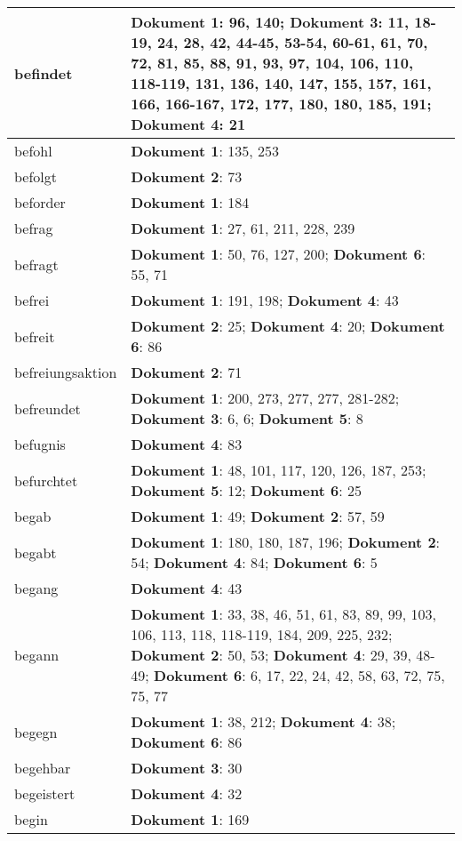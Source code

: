 \documentclass[a5paper]{article}
\begin{document}
\begin{longtable}[l]{|l|p{3in}|}
\hline
befindet & \textbf{Dokument 1}: 96, 140; \textbf{Dokument 3}: 11, 18-19, 24, 28, 42, 44-45, 53-54, 60-61, 61, 70, 72, 81, 85, 88, 91, 93, 97, 104, 106, 110, 118-119, 131, 136, 140, 147, 155, 157, 161, 166, 166-167, 172, 177, 180, 180, 185, 191; \textbf{Dokument 4}: 21 \\
\hline
befohl & \textbf{Dokument 1}: 135, 253 \\
\hline
befolgt & \textbf{Dokument 2}: 73 \\
\hline
beforder & \textbf{Dokument 1}: 184 \\
\hline
befrag & \textbf{Dokument 1}: 27, 61, 211, 228, 239 \\
\hline
befragt & \textbf{Dokument 1}: 50, 76, 127, 200; \textbf{Dokument 6}: 55, 71 \\
\hline
befrei & \textbf{Dokument 1}: 191, 198; \textbf{Dokument 4}: 43 \\
\hline
befreit & \textbf{Dokument 2}: 25; \textbf{Dokument 4}: 20; \textbf{Dokument 6}: 86 \\
\hline
befreiungsaktion & \textbf{Dokument 2}: 71 \\
\hline
befreundet & \textbf{Dokument 1}: 200, 273, 277, 277, 281-282; \textbf{Dokument 3}: 6, 6; \textbf{Dokument 5}: 8 \\
\hline
befugnis & \textbf{Dokument 4}: 83 \\
\hline
befurchtet & \textbf{Dokument 1}: 48, 101, 117, 120, 126, 187, 253; \textbf{Dokument 5}: 12; \textbf{Dokument 6}: 25 \\
\hline
begab & \textbf{Dokument 1}: 49; \textbf{Dokument 2}: 57, 59 \\
\hline
begabt & \textbf{Dokument 1}: 180, 180, 187, 196; \textbf{Dokument 2}: 54; \textbf{Dokument 4}: 84; \textbf{Dokument 6}: 5 \\
\hline
begang & \textbf{Dokument 4}: 43 \\
\hline
begann & \textbf{Dokument 1}: 33, 38, 46, 51, 61, 83, 89, 99, 103, 106, 113, 118, 118-119, 184, 209, 225, 232; \textbf{Dokument 2}: 50, 53; \textbf{Dokument 4}: 29, 39, 48-49; \textbf{Dokument 6}: 6, 17, 22, 24, 42, 58, 63, 72, 75, 75, 77 \\
\hline
begegn & \textbf{Dokument 1}: 38, 212; \textbf{Dokument 4}: 38; \textbf{Dokument 6}: 86 \\
\hline
begehbar & \textbf{Dokument 3}: 30 \\
\hline
begeistert & \textbf{Dokument 4}: 32 \\
\hline
begin & \textbf{Dokument 1}: 169 \\

\end{longtable}
\end{document}
